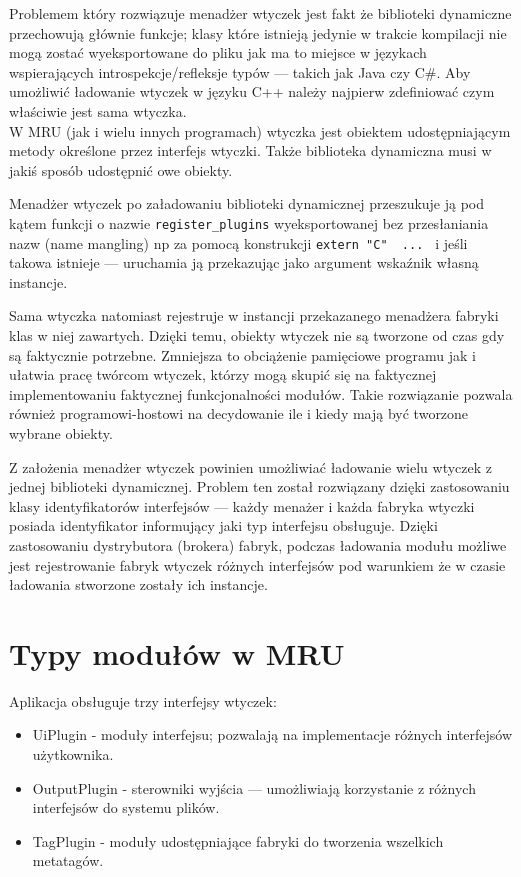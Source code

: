 \par
Problemem który rozwiązuje menadżer wtyczek jest fakt że biblioteki dynamiczne przechowują głównie funkcje; klasy które istnieją jedynie w trakcie kompilacji nie mogą zostać wyeksportowane do pliku jak ma to miejsce w językach wspierających introspekcje/refleksje typów --- takich jak Java czy C\#.
Aby umożliwić ładowanie wtyczek w języku C++ należy najpierw zdefiniować czym właściwie jest sama wtyczka.\\

W MRU (jak i wielu innych programach) wtyczka jest obiektem udostępniającym metody określone przez interfejs wtyczki. Także biblioteka dynamiczna musi w jakiś sposób udostępnić owe obiekty.

\par
Menadżer wtyczek po załadowaniu biblioteki dynamicznej przeszukuje ją pod kątem funkcji o nazwie \texttt{register\_plugins} wyeksportowanej bez przesłaniania nazw (name mangling) np za pomocą konstrukcji \texttt{extern "C" { ... }} i jeśli takowa istnieje --- uruchamia ją przekazując jako argument wskaźnik własną instancje.
\par
Sama wtyczka natomiast rejestruje w instancji przekazanego menadżera fabryki klas w niej zawartych.
Dzięki temu, obiekty wtyczek nie są tworzone od czas gdy są faktycznie potrzebne. Zmniejsza to obciążenie pamięciowe programu jak i ułatwia pracę twórcom wtyczek, którzy mogą skupić się na faktycznej implementowaniu faktycznej funkcjonalności modułów. Takie rozwiązanie pozwala również programowi-hostowi na decydowanie ile i kiedy mają być tworzone wybrane obiekty.

Z założenia menadżer wtyczek powinien umożliwiać ładowanie wielu wtyczek z jednej biblioteki dynamicznej.
Problem ten został rozwiązany dzięki zastosowaniu klasy identyfikatorów interfejsów --- każdy menażer i każda fabryka wtyczki posiada identyfikator informujący jaki typ interfejsu obsługuje. Dzięki zastosowaniu dystrybutora (brokera) fabryk, podczas ładowania modułu możliwe jest rejestrowanie fabryk wtyczek różnych interfejsów pod warunkiem że w czasie ładowania stworzone zostały ich instancje.

\section{Typy modułów w MRU} 
Aplikacja obsługuje trzy interfejsy wtyczek:
\begin{itemize}
\item UiPlugin - moduły interfejsu; pozwalają na implementacje różnych interfejsów użytkownika.
\item OutputPlugin - sterowniki wyjścia --- umożliwiają korzystanie z różnych interfejsów do systemu plików.
\item TagPlugin - moduły udostępniające fabryki do tworzenia wszelkich metatagów.
\end{itemize}

